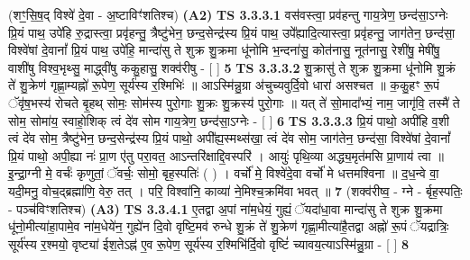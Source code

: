 \documentclass[17pt]{extarticle}
\begin{document}
                  \newline
                      (शꣳ॒॒सि॒ष॒द् विश्वे॑ दे॒वा - अ॒ष्टाविꣳ॑शतिश्च)  \textbf{(A2)} \newline \newline
                                        \textbf{ TS 3.3.3.1} \newline
                  वस॑वस्त्वा॒ प्रव॑हन्तु गाय॒त्रेण॒ छन्द॑सा॒ऽग्नेः प्रि॒यं पाथ॒ उपे॑हि रु॒द्रास्त्वा॒ प्रवृ॑हन्तु॒ त्रैष्टु॑भेन॒ छन्द॒सेन्द्र॑स्य प्रि॒यं पाथ॒ उपे᳚ह्यादि॒त्यास्त्वा॒ प्रवृ॑हन्तु॒ जाग॑तेन॒ छन्द॑सा॒ विश्वे॑षां दे॒वानां᳚ प्रि॒यं पाथ॒ उपे॑हि॒ मान्दा॑सु ते शुक्र शु॒क्रमा धू॑नोमि भ॒न्दना॑सु॒ कोत॑नासु॒ नूत॑नासु॒ रेशी॑षु॒ मेषी॑षु॒ वाशी॑षु विश्व॒भृथ्सु॒ माद्ध्वी॑षु ककु॒हासु॒ शक्व॑रीषु - [  ] \textbf{  5} \newline
                  \newline
                                \textbf{ TS 3.3.3.2} \newline
                  शु॒क्रासु॑ ते शुक्र शु॒क्रमा धू॑नोमि शु॒क्रं ते॑ शु॒क्रेण॑ गृह्णा॒म्यह्नो॑ रू॒पेण॒ सूर्य॑स्य र॒श्मिभिः॑ ॥ आऽस्मि॑न्नु॒ग्रा अ॑चुच्यवुर्दि॒वो धारा॑ असश्चत ॥ क॒कु॒हꣳ रू॒पं ॅवृ॑ष॒भस्य॑ रोचते बृ॒हथ् सोमः॒ सोम॑स्य पुरो॒गाः शु॒क्रः शु॒क्रस्य॑ पुरो॒गाः ॥ यत् ते॑ सो॒मादा᳚भ्यं॒ नाम॒ जागृ॑वि॒ तस्मै॑ ते सोम॒ सोमा॑य॒ स्वाहो॒शिक् त्वं दे॑व सोम गाय॒त्रेण॒ छन्द॑सा॒ऽग्नेः - [  ] \textbf{  6} \newline
                  \newline
                                \textbf{ TS 3.3.3.3} \newline
                  प्रि॒यं पाथो॒ अपी॑हि व॒शी त्वं दे॑व सोम॒ त्रैष्टु॑भेन॒ छन्द॒सेन्द्र॑स्य प्रि॒यं पाथो॒ अपी᳚ह्य॒स्मथ्स॑खा॒ त्वं दे॑व सोम॒ जाग॑तेन॒ छन्द॑सा॒ विश्वे॑षां दे॒वानां᳚ प्रि॒यं पाथो॒ अपी॒ह्या नः॑ प्रा॒ण ए॑तु परा॒वत॒ आऽन्तरि॑क्षाद्दि॒वस्परि॑ । आयुः॑ पृथि॒व्या अद्ध्य॒मृत॑मसि प्रा॒णाय॑ त्वा ॥ इ॒न्द्रा॒ग्नी मे॒ वर्चः॑ कृणुतां॒ ॅवर्चः॒ सोमो॒ बृह॒स्पतिः॑ ( ) । वर्चो॑ मे॒ विश्वे॑दे॒वा वर्चो॑ मे धत्तमश्विना ॥ द॒ध॒न्वे वा॒ यदी॒मनु॒ वोच॒द्ब्रह्मा॑णि॒ वेरु॒ तत् । परि॒ विश्वा॑नि॒ काव्या॑ ने॒मिश्च॒क्रमि॑वा भवत् ॥ \textbf{  7} \newline
                  \newline
                      (शक्व॑रीष्व॒ - ग्ने - र्बृह॒स्पतिः॒ - पञ्च॑विꣳशतिश्च)  \textbf{(A3)} \newline \newline
                                        \textbf{ TS 3.3.4.1} \newline
                  ए॒तद्वा अ॒पां ना॑म॒धेयं॒ गुह्यं॒ ॅयदा॑धा॒वा मान्दा॑सु ते शुक्र शु॒क्रमा धू॑नो॒मीत्या॑हा॒पामे॒व ना॑म॒धेये॑न॒ गुह्ये॑न दि॒वो वृष्टि॒मव॑ रुन्धे शु॒क्रं ते॑ शु॒क्रेण॑ गृह्णा॒मीत्या॑है॒तद्वा अह्नो॑ रू॒पं ॅयद्रात्रिः॒ सूर्य॑स्य र॒श्मयो॒ वृष्ट्या॑ ईश॒तेऽह्न॑ ए॒व रू॒पेण॒ सूर्य॑स्य र॒श्मिभि॑र्दि॒वो वृष्टिं॑ च्यावय॒त्याऽस्मि॑न्नु॒ग्रा - [  ] \textbf{  8} \newline
\end{document}
